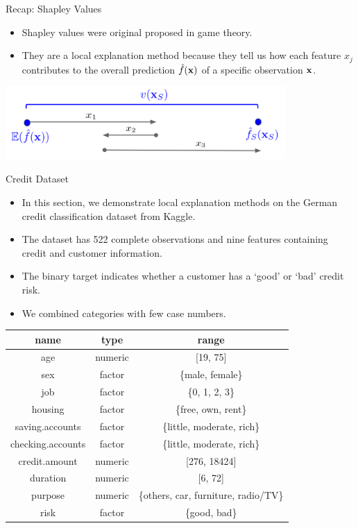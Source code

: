 \documentclass[11pt,compress,t,notes=noshow, aspectratio=169, xcolor=table]{beamer}
\begin{document}
\begin{vbframe}{Recap: Shapley Values}
	\begin{itemize}
		\item Shapley values were original proposed in game theory.
		\item They are a local explanation method because they tell us how each feature $x_j$ contributes to the overall prediction $\fh(\xv)$ of a specific observation $\xv$. 
	\end{itemize}
\vspace{0.5cm}
\begin{center}
	\includegraphics[width=0.8\textwidth]{figure/shapley_valuefct}
\end{center}
\end{vbframe}

\begin{vbframe}{Credit Dataset}

	\begin{itemize}
		\item In this section, we demonstrate local explanation methods on the German credit classification dataset from Kaggle. \href{https://www.kaggle.com/uciml/german-credit}{}
		\item The dataset has 522 complete observations and nine features containing credit and customer information.
		\item The binary target indicates whether a customer has a `good' or `bad' credit risk.  
		\item We combined categories with few case numbers. 
	\end{itemize}
		\begin{center}
			\footnotesize
			\begin{tabular}{ccc}
				\hline
				name & type & range\\
				\hline
				age & numeric & [19, 75]\\
				sex & factor & \{male, female\}\\
				job & factor & \{0, 1, 2, 3\}\\
				housing & factor & \{free, own, rent\}\\
				saving.accounts & factor & \{little, moderate, rich\}\\
				checking.accounts & factor & \{little, moderate, rich\}\\
				credit.amount & numeric & [276, 18424]\\
				duration & numeric &  [6, 72]\\
				purpose & numeric &  \{others, car, furniture, radio/TV\}\\
				risk & factor & \{good, bad\}
			\end{tabular}
		\end{center}
\end{vbframe}

\endlecture
\end{document}
